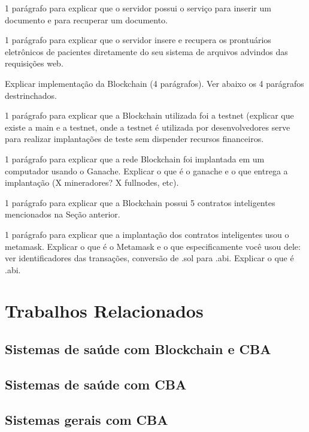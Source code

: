 \documentclass[a4paper,11pt]{article}
\begin{document}
{\color{Magenta} 1 parágrafo para explicar que o servidor possui o serviço para inserir um documento e para recuperar um documento.}

{\color{Magenta} 1 parágrafo para explicar que o servidor insere e recupera os prontuários eletrônicos de pacientes diretamente do seu sistema de arquivos advindos das requisições web.}


{\color{ForestGreen} Explicar implementação da Blockchain (4 parágrafos). Ver abaixo os 4 parágrafos destrinchados. }

{\color{Magenta} 1 parágrafo para explicar que a Blockchain utilizada foi a testnet (explicar que existe a main e a testnet, onde a testnet é utilizada por desenvolvedores serve para realizar implantações de teste sem dispender recursos financeiros.}

{\color{Magenta} 1 parágrafo para explicar que a rede Blockchain foi implantada em um computador usando o Ganache. Explicar o que é o ganache e o que entrega a implantação (X mineradores? X fullnodes, etc).}

{\color{Magenta} 1 parágrafo para explicar que a Blockchain possui 5 contratos inteligentes mencionados na Seção anterior.}

{\color{Magenta} 1 parágrafo para explicar que a implantação dos contratos inteligentes usou o metamask. Explicar o que é o Metamask e o que especificamente você usou dele: ver identificadores das transações, conversão de .sol para .abi. Explicar o que é .abi.}

\newpage
\section{Trabalhos Relacionados}

\subsection{Sistemas de saúde com Blockchain e CBA}

\subsection{Sistemas de saúde com CBA}
\label{sub:sec:saude-cba}

\subsection{Sistemas gerais com CBA}
\end{document}
